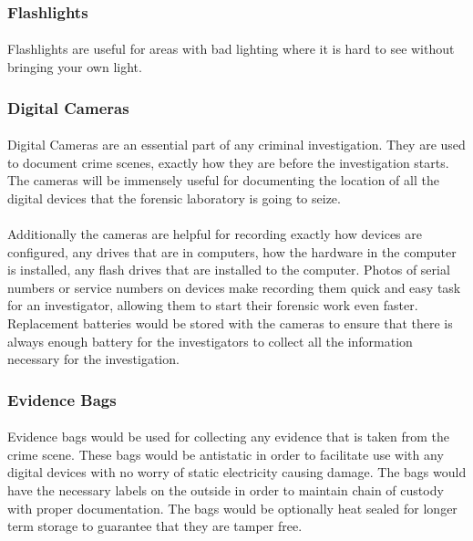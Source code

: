 \documentclass[12pt]{article}
\begin{document}
\subsubsection{Flashlights}
\paragraph{}
Flashlights are useful for areas with bad lighting where it is hard to see without bringing your own light. 
\subsubsection{Digital Cameras}
\paragraph{}
Digital Cameras are an essential part of any criminal investigation.
\cite[p.~122]{hayes}
They are used to document crime scenes, exactly how they are before the investigation starts. 
The cameras will be immensely useful for documenting the location of all the digital devices that the forensic laboratory is going to seize. 
\paragraph{}
Additionally the cameras are helpful for recording exactly how devices are configured, any drives that are in computers, how the hardware in the computer is installed, any flash drives that are installed to the computer.
Photos of serial numbers or service numbers on devices make recording them quick and easy task for an investigator, allowing them to start their forensic work even faster. 
Replacement batteries would be stored with the cameras to ensure that there is always enough battery for the investigators to collect all the information necessary for the investigation.
\subsubsection{Evidence Bags}
\paragraph{}
Evidence bags would be used for collecting any evidence that is taken from the crime scene.
These bags would be antistatic in order to facilitate use with any digital devices with no worry of static electricity causing damage. 
The bags would have the necessary labels on the outside in order to maintain chain of custody with proper documentation. 
The bags would be optionally heat sealed for longer term storage to guarantee that they are tamper free. 
\end{document}
